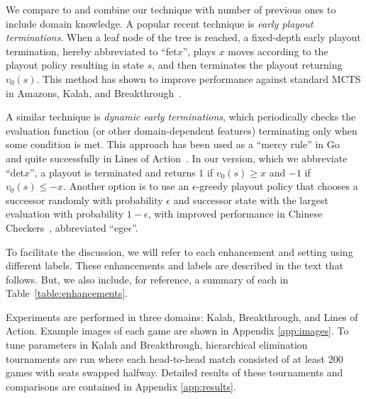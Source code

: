 \documentclass{article}
\begin{document}
We compare to and combine our technique with number of previous ones to include  
domain knowledge. A popular recent technique is {\it early playout terminations}. When a leaf node of the tree 
is reached, a fixed-depth early playout termination, hereby abbreviated to ``fet$x$'', plays $x$ moves according
to the playout policy resulting in state $s$, and then terminates the playout returning $v_0(s)$. This method has
shown to improve performance against standard MCTS in Amazons, Kalah, and 
Breakthrough~\cite{Lorentz13Breakthrough,Ramanujan11Tradeoffs,Lorentz08Amazons}. 

A similar technique is {\it dynamic early terminations}, which periodically checks the evaluation function 
(or other domain-dependent features) terminating only when some condition is met. 
This approach has been used as a ``mercy rule'' in Go~\cite{Bouzy07Old} and quite successfully in 
Lines of Action~\cite{Winands08MCTSSolver}.
In our version, which we abbreviate ``det$x$'', a playout is terminated and returns $1$ if $v_0(s) \ge x$ and 
$-1$ if $v_0(s) \le -x$. Another option is to use an $\epsilon$-greedy playout policy that chooses a successor randomly 
with probability $\epsilon$ and successor state with the largest evaluation with probability $1-\epsilon$, with 
improved performance in Chinese Checkers~\cite{Sturtevant08An,Nijssen12Playout}, abbreviated ``ege$\epsilon$''.

To facilitate the discussion, 
we will refer to each enhancement and setting using different labels. These enhancements and labels are described in 
the text that follows. But, we also include, for reference, a summary of each in Table~\ref{table:enhancements}.

Experiments are performed in three domains: Kalah, Breakthrough, and Lines of Action. Example images of each 
game are shown in Appendix \ref{app:images}.
To tune parameters in Kalah and Breakthrough, hierarchical elimination tournaments are run where each 
head-to-head match consisted of at least 200 games with seats swapped halfway. 
Detailed results of these tournaments and comparisons are contained in Appendix \ref{app:results}.
\end{document}
